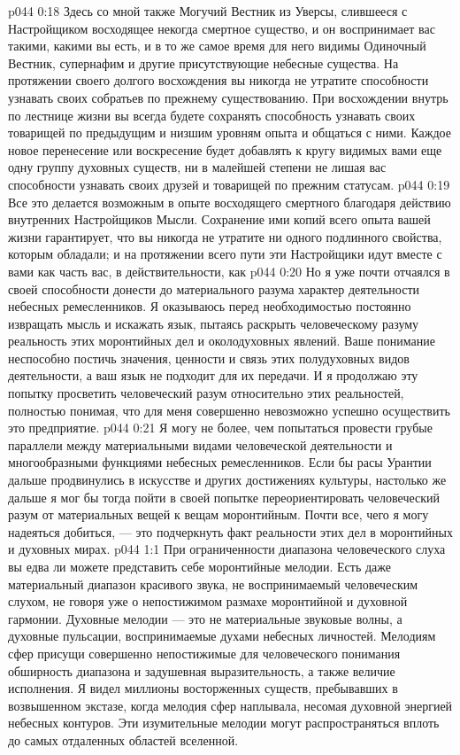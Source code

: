 \vs p044 0:18 Здесь со мной также Могучий Вестник из Уверсы, слившееся с Настройщиком восходящее некогда смертное существо, и он воспринимает вас такими, какими вы есть, и в то же самое время для него видимы Одиночный Вестник, супернафим и другие присутствующие небесные существа. На протяжении своего долгого восхождения вы никогда не утратите способности узнавать своих собратьев по прежнему существованию. При восхождении внутрь по лестнице жизни вы всегда будете сохранять способность узнавать своих товарищей по предыдущим и низшим уровням опыта и общаться с ними. Каждое новое перенесение или воскресение будет добавлять к кругу видимых вами еще одну группу духовных существ, ни в малейшей степени не лишая вас способности узнавать своих друзей и товарищей по прежним статусам.
\vs p044 0:19 Все это делается возможным в опыте восходящего смертного благодаря действию внутренних Настройщиков Мысли. Сохранение ими копий всего опыта вашей жизни гарантирует, что вы никогда не утратите ни одного подлинного свойства, которым обладали; и на протяжении всего пути эти Настройщики идут вместе с вами как часть вас, в действительности, как 
\vs p044 0:20 Но я уже почти отчаялся в своей способности донести до материального разума характер деятельности небесных ремесленников. Я оказываюсь перед необходимостью постоянно извращать мысль и искажать язык, пытаясь раскрыть человеческому разуму реальность этих моронтийных дел и околодуховных явлений. Ваше понимание неспособно постичь значения, ценности и связь этих полудуховных видов деятельности, а ваш язык не подходит для их передачи. И я продолжаю эту попытку просветить человеческий разум относительно этих реальностей, полностью понимая, что для меня совершенно невозможно успешно осуществить это предприятие.
\vs p044 0:21 \pc Я могу не более, чем попытаться провести грубые параллели между материальными видами человеческой деятельности и многообразными функциями небесных ремесленников. Если бы расы Урантии дальше продвинулись в искусстве и других достижениях культуры, настолько же дальше я мог бы тогда пойти в своей попытке переориентировать человеческий разум от материальных вещей к вещам моронтийным. Почти все, чего я могу надеяться добиться, --- это подчеркнуть факт реальности этих дел в моронтийных и духовных мирах.
\vs p044 1:1 При ограниченности диапазона человеческого слуха вы едва ли можете представить себе моронтийные мелодии. Есть даже материальный диапазон красивого звука, не воспринимаемый человеческим слухом, не говоря уже о непостижимом размахе моронтийной и духовной гармонии. Духовные мелодии --- это не материальные звуковые волны, а духовные пульсации, воспринимаемые духами небесных личностей. Мелодиям сфер присущи совершенно непостижимые для человеческого понимания обширность диапазона и задушевная выразительность, а также величие исполнения. Я видел миллионы восторженных существ, пребывавших в возвышенном экстазе, когда мелодия сфер наплывала, несомая духовной энергией небесных контуров. Эти изумительные мелодии могут распространяться вплоть до самых отдаленных областей вселенной.
